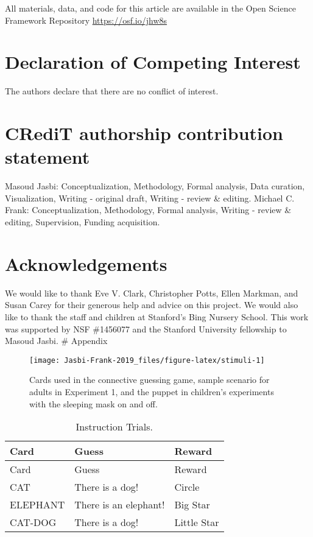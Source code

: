 \documentclass[
  english,
  ,man,floatsintext]{apa6}
\begin{document}
All materials, data, and code for this article are available in the Open Science Framework Repository \url{https://osf.io/jhw8s}

\hypertarget{declaration-of-competing-interest}{%
\section{Declaration of Competing Interest}\label{declaration-of-competing-interest}}

The authors declare that there are no conflict of interest.

\hypertarget{credit-authorship-contribution-statement}{%
\section{CRediT authorship contribution statement}\label{credit-authorship-contribution-statement}}

Masoud Jasbi: Conceptualization, Methodology, Formal analysis, Data curation, Visualization, Writing - original draft, Writing - review \& editing. Michael C. Frank: Conceptualization, Methodology, Formal analysis, Writing - review \& editing, Supervision, Funding acquisition.

\hypertarget{acknowledgements}{%
\section{Acknowledgements}\label{acknowledgements}}

We would like to thank Eve V. Clark, Christopher Potts, Ellen Markman, and Susan Carey for their generous help and advice on this project. We would also like to thank the staff and children at Stanford's Bing Nursery School. This work was supported by NSF \#1456077 and the Stanford University fellowship to Masoud Jasbi.
\# Appendix

\begin{figure}

{\centering \texttt{[image: Jasbi-Frank-2019\_files/figure-latex/stimuli-1]} 

}

\caption{Cards used in the connective guessing game, sample scenario for adults in Experiment 1, and the puppet in children's experiments with the sleeping mask on and off.}\label{fig:stimuli}
\end{figure}

\begin{longtable}[]{@{}lll@{}}
\caption{\label{tab:instruction} Instruction Trials.}\tabularnewline
\toprule
Card & Guess & Reward\tabularnewline
\midrule
\endfirsthead
\toprule
Card & Guess & Reward\tabularnewline
\midrule
\endhead
CAT & There is a dog! & Circle\tabularnewline
ELEPHANT & There is an elephant! & Big Star\tabularnewline
CAT-DOG & There is a dog! & Little Star\tabularnewline
\bottomrule
\end{longtable}
\end{document}
